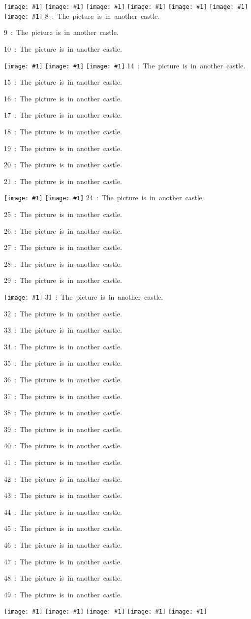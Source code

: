 \documentclass[12pt]{article}
\begin{document}
\pdfpageheight=0cm\pdfpagewidth=0cm
\pdfvorigin=0cm\pdfhorigin=0cm

\newcommand{\mpspage}[1]{\shipout\hbox{\texttt{[image: \#1]}}}
\newcommand{\nofigpage}[1]{%
   \shipout\hbox{#1 : The picture is in another castle.}%
}

\mpspage{branching.1}
\mpspage{branching.2}
\mpspage{branching.3}
\mpspage{branching.4}
\mpspage{branching.5}
\mpspage{branching.6}
\mpspage{branching.7}
\nofigpage{8}
\nofigpage{9}
\nofigpage{10}
\mpspage{branching.11}
\mpspage{branching.12}
\mpspage{branching.13}
\nofigpage{14}
\nofigpage{15}
\nofigpage{16}
\nofigpage{17}
\nofigpage{18}
\nofigpage{19}
\nofigpage{20}
\nofigpage{21}
\mpspage{branching.22}
\mpspage{branching.23}
\nofigpage{24}
\nofigpage{25}
\nofigpage{26}
\nofigpage{27}
\nofigpage{28}
\nofigpage{29}
\mpspage{branching.30}
\nofigpage{31}
\nofigpage{32}
\nofigpage{33}
\nofigpage{34}
\nofigpage{35}
\nofigpage{36}
\nofigpage{37}
\nofigpage{38}
\nofigpage{39}
\nofigpage{40}
\nofigpage{41}
\nofigpage{42}
\nofigpage{43}
\nofigpage{44}
\nofigpage{45}
\nofigpage{46}
\nofigpage{47}
\nofigpage{48}
\nofigpage{49}
\mpspage{branching.50}
\mpspage{branching.51}
\mpspage{branching.52}
\mpspage{branching.53}
\mpspage{branching.54}
\end{document}
